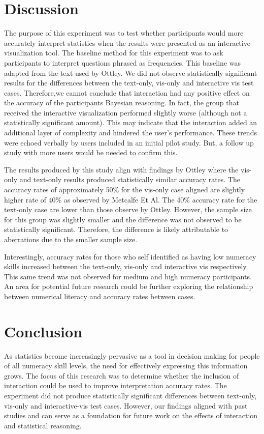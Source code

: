 \section{Discussion}
The purpose of this experiment was to test whether participants would more
accurately interpret statistics when the results were presented as an
interactive visualization tool. The baseline method for this experiment was
to ask participants to interpret questions phrased as frequencies. This
baseline was adapted from the text used by Ottley. We did not observe
statistically significant results for the differences between the text-only,
vis-only and interactive vis test cases. Therefore,we cannot conclude that
interaction had any positive effect on the accuracy of the participants
Bayesian reasoning. In fact, the group that received the interactive
visualization performed slightly worse (although not a statistically
significant amount). This may indicate that the interaction added an
additional layer of complexity and hindered the user's performance. These
trends were echoed verbally by users included in an initial pilot study. But,
a follow up study with more users would be needed to confirm this.

The results produced by this study align with findings by Ottley where the
vis-only and text-only results produced statistically similar accuracy rates.
The accuracy rates of approximately 50\% for the vis-only case aligned are
slightly higher rate of 40\% as observed by Metcalfe Et Al. The 40\% accuracy
rate for the text-only case are lower than those observe by Ottley. However,
the sample size for this group was slightly smaller and the difference was
not observed to be statistically significant. Therefore, the difference is
likely attributable to aberrations due to the smaller sample size.

Interestingly, accuracy rates for those who self identified as having low
numeracy skills increased between the text-only, vis-only and interactive vis
respectively. This same trend was not observed for medium and high numeracy
participants. An area for potential future research could be further
exploring the relationship between numerical literacy and accuracy rates
between cases.


\section{Conclusion}
\label{sec:conclusion}
As statistics become increasingly pervasive as a tool in decision making for
people of all numeracy skill levels, the need for effectively expressing this
information grows. The focus of this research was to determine whether the
inclusion of interaction could be used to improve interpretation accuracy
rates. The experiment did not produce statistically significant differences
between text-only, vis-only and interactive-vis test cases. However, our
findings aligned with past studies and can serve as a foundation for future
work on the effects of interaction and statistical reasoning.